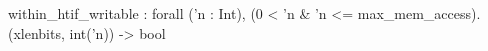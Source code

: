 within_htif_writable : forall ('n : Int), (0 < 'n & 'n <= max_mem_access). (xlenbits, int('n)) -> bool